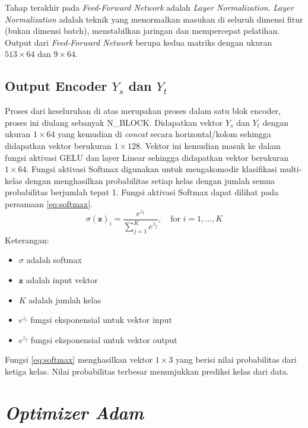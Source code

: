 Tahap terakhir pada \textit{Feed-Forward Network} adalah \textit{Layer Normalization}. \textit{Layer Normalization} adalah teknik yang menormalkan masukan di seluruh dimensi fitur (bukan dimensi batch), menstabilkan jaringan dan mempercepat pelatihan. Output dari \textit{Feed-Forward Network} berupa kedua matriks dengan ukuran $513\times64$ dan $9\times64$.

\section{Output Encoder $Y_s$ dan $Y_t$}
Proses dari keseluruhan di atas merupakan proses dalam satu blok encoder, proses ini diulang sebanyak N\_BLOCK. Didapatkan vektor $Y_s$ dan $Y_t$ dengan ukuran $1\times64$ yang kemudian di \textit{concat} secara horizontal/kolom sehingga didapatkan vektor berukuran $1\times128$. Vektor ini kemudian masuk ke dalam fungsi aktivasi GELU dan layer Linear sehingga didapatkan vektor berukuran $1\times64$. Fungsi aktivasi Softmax digunakan untuk mengakomodir klasifikasi multi-kelas dengan menghasilkan probabilitas setiap kelas dengan jumlah semua probabilitas berjumlah tepat 1. Fungsi aktivasi Softmax dapat dilihat pada persamaan \ref{eq:softmax}.
\begin{equation}
    \sigma(\mathbf{z})_i = \frac{e^{z_i}}{\sum_{j=1}^{K} e^{z_j}}, \quad \text{for } i = 1, \ldots, K
    \label{eq:softmax}
\end{equation}
Keterangan:
\begin{itemize}
    \item $\sigma$ adalah softmax
    \item $\mathbf{z}$ adalah input vektor
    \item $K$ adalah jumlah kelas
    \item $e^{z_i}$ fungsi eksponensial untuk vektor input
    \item $e^{z_j}$ fungsi eksponensial untuk vektor output
\end{itemize}
Fungsi \ref{eq:softmax} menghasilkan vektor $1\times3$ yang berisi nilai probabilitas dari ketiga kelas. Nilai probabilitas terbesar menunjukkan prediksi kelas dari data.

\chapter{\textit{Optimizer Adam}} \label{lam:lampiran_a}

